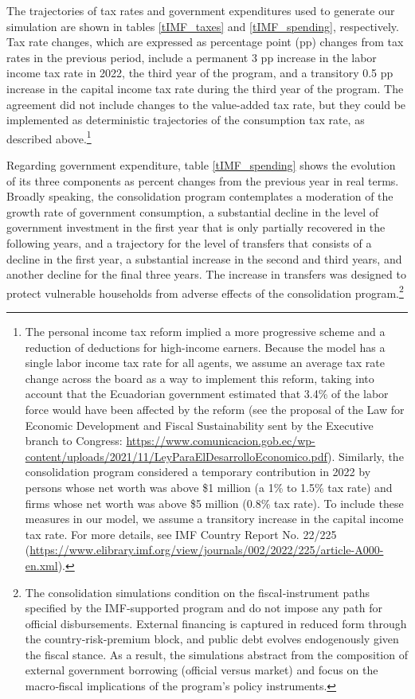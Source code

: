 \documentclass[12pt]{article}
\begin{document}
The trajectories of tax rates and government expenditures used to generate our simulation are shown in tables \ref{tIMF_taxes} and \ref{tIMF_spending}, respectively. Tax rate changes, which are expressed as percentage point (pp) changes from tax rates in the previous period, include a permanent 3 pp increase in the labor income tax rate in 2022, the third year of the program, and a transitory 0.5 pp increase in the capital income tax rate during the third year of the program. The agreement did not include changes to the value-added tax rate, but they could be implemented as deterministic trajectories of the consumption tax rate, as described above.\footnote{The personal income tax reform implied a more progressive scheme and a reduction of deductions for high-income earners. Because the model has a single labor income tax rate for all agents, we assume an average tax rate change across the board as a way to implement this reform, taking into account that the Ecuadorian government estimated that 3.4\% of the labor force would have been affected by the reform (see the proposal of the Law for Economic Development and Fiscal Sustainability sent by the Executive branch to Congress: \url{https://www.comunicacion.gob.ec/wp-content/uploads/2021/11/LeyParaElDesarrolloEconomico.pdf}). Similarly, the consolidation program considered a temporary contribution in 2022 by persons whose net worth was above \$1 million (a 1\% to 1.5\% tax rate) and firms whose net worth was above \$5 million (0.8\% tax rate). To include these measures in our model, we assume a transitory increase in the capital income tax rate. For more details, see IMF Country Report No. 22/225 (\url{https://www.elibrary.imf.org/view/journals/002/2022/225/article-A000-en.xml}).}

Regarding government expenditure, table \ref{tIMF_spending} shows the evolution of its three components as percent changes from the previous year in real terms. Broadly speaking, the consolidation program contemplates a moderation of the growth rate of government consumption, a substantial decline in the level of government investment in the first year that is only partially recovered in the following years, and a trajectory for the level of transfers that consists of a decline in the first year, a substantial increase in the second and third years, and another decline for the final three years. The increase in transfers was designed to protect vulnerable households from adverse effects of the consolidation program.\footnote{The consolidation simulations condition on the fiscal‑instrument paths specified by the IMF‑supported program and do not impose any path for official disbursements. External financing is captured in reduced form through the country‑risk‑premium block, and public debt evolves endogenously given the fiscal stance. As a result, the simulations abstract from the composition of external government borrowing (official versus market) and focus on the macro‑fiscal implications of the program’s policy instruments.}
\end{document}
